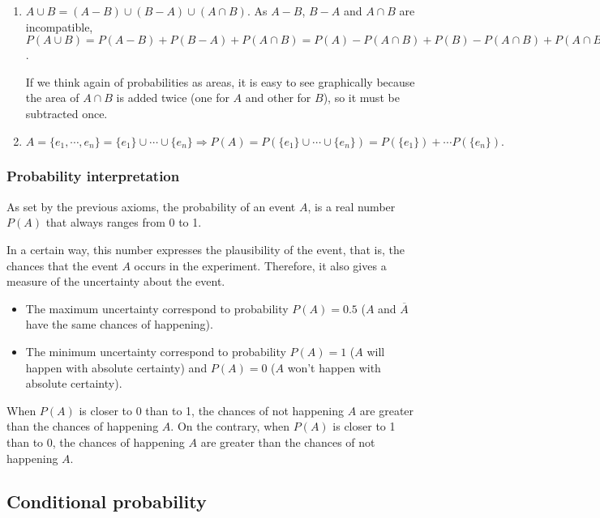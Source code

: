 \begin{frame}
{\begin{enumerate}
\item $A\cup B= (A-B) \cup (B-A) \cup (A\cap B)$. As $A-B$, $B-A$ and $A\cap B$ are incompatible, $P(A\cup
B)=P(A-B)+P(B-A)+P(A\cap B) = P(A)-P(A\cap B)+P(B)-P(A\cap B)+P(A\cap B)= P(A)+P(B)-P(A\cup B)$.

If we think again of probabilities as areas, it is easy to see graphically because the area of $A\cap B$ is added twice (one for $A$ and other for $B$), so it must be subtracted once. 
\begin{center}

\end{center}
\item $A=\{e_1,\cdots,e_n\} = \{e_1\}\cup \cdots \cup \{e_n\} \Rightarrow P(A)=P(\{e_1\}\cup \cdots \cup \{e_n\}) =
P(\{e_1\})+ \cdots P(\{e_n\}).$
\end{enumerate}
}
\end{frame}


\begin{frame}
\frametitle{Probability interpretation}
As set by the previous axioms, the probability of an event $A$, is a real number $P(A)$ that always ranges from 0 to 1. 

In a certain way, this number expresses the plausibility of the event, that is, the chances that the event $A$ occurs in the experiment.
Therefore, it also gives a measure of the uncertainty about the event.
\begin{itemize}
\item The maximum uncertainty correspond to probability $P(A)=0.5$ ($A$ and $\overline A$ have the same chances of happening).
\item The minimum uncertainty correspond to probability $P(A)=1$ ($A$ will happen with absolute certainty) and $P(A)=0$ ($A$ won't happen with absolute certainty).
\end{itemize} 

When $P(A)$ is closer to 0 than to 1, the chances of not happening $A$ are greater than the chances of happening $A$.
On the contrary, when $P(A)$ is closer to 1 than to 0, the chances of happening $A$ are greater than the chances of not happening $A$.
\end{frame}


\subsection{Conditional probability}

